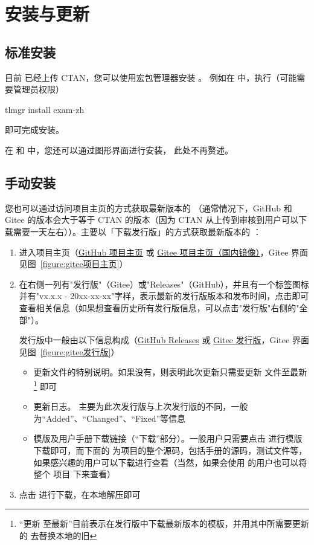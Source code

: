 
\section{安装与更新}


\subsection{标准安装}

目前  已经上传 CTAN，您可以使用宏包管理器安装 。
例如在 \TeXLive{} 中，执行（可能需要管理员权限）
\begin{shellcode}[morekeywords={tlmgr,install}]
  tlmgr install exam-zh
\end{shellcode}
即可完成安装。

在 \TeXLive{} 和 \MiKTeX{} 中，您还可以通过图形界面进行安装，
此处不再赘述。


\subsection{手动安装}

您也可以通过访问项目主页的方式获取最新版本的 （通常情况下，GitHub 和 Gitee 的版本会大于等于 CTAN 的版本（因为 CTAN 从上传到审核到用户可以下载需要一天左右））。主要以「下载发行版」的方式获取最新版本的 ：

\begin{enumerate}
  \item 进入项目主页（\href{https://github.com/xkwxdyy/exam-zh}{GitHub 项目主页} 或 \href{https://gitee.com/xkwxdyy/exam-zh}{Gitee 项目主页（国内镜像）}，Gitee 界面见图~\ref{figure:gitee项目主页}）
  \item 在右侧一列有"发行版"（Gitee）或"Releases"（GitHub），并且有一个标签图标并有"vx.x.x - 20xx-xx-xx"字样，表示最新的发行版版本和发布时间，点击即可查看相关信息（如果想查看历史所有发行版信息，可以点击"发行版"右侧的"全部"）。

    发行版中一般由以下信息构成（\href{https://github.com/xkwxdyy/exam-zh/releases}{GitHub Releases} 或 \href{https://gitee.com/xkwxdyy/exam-zh/releases}{Gitee 发行版}，Gitee 界面见图~\ref{figure:gitee发行版}）
      \begin{itemize}
        \item 更新文件的特别说明。如果没有，则表明此次更新只需要更新  文件至最新\footnote{“更新  至最新”目前表示在发行版中下载最新版本的模板，并用其中所需要更新的  去替换本地的旧 } 即可
        \item 更新日志。 主要为此次发行版与上次发行版的不同，一般为“Added”、“Changed”、“Fixed”等信息
        \item 模版及用户手册下载链接（“下载”部分）。一般用户只需要点击  进行模版下载即可，而下面的  为项目的整个源码，包括手册的源码，测试文件等，如果感兴趣的用户可以下载进行查看（当然，如果会使用  的用户也可以将整个  项目  下来查看）
      \end{itemize}
  \item 点击  进行下载，在本地解压即可
\end{enumerate}


